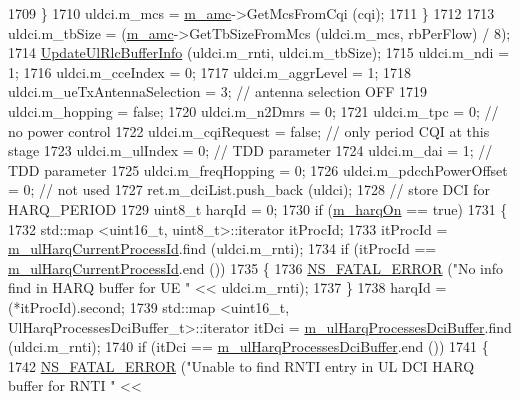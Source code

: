 \begin{DoxyCode}
1709             \}
1710           uldci.m\_mcs = \hyperlink{classns3_1_1TtaFfMacScheduler_a9c8e60d48cae88a03fb5621285733186}{m\_amc}->GetMcsFromCqi (cqi);
1711         \}
1712 
1713       uldci.m\_tbSize = (\hyperlink{classns3_1_1TtaFfMacScheduler_a9c8e60d48cae88a03fb5621285733186}{m\_amc}->GetTbSizeFromMcs (uldci.m\_mcs, rbPerFlow) / 8);
1714       \hyperlink{classns3_1_1TtaFfMacScheduler_ab833bf3832b55e3483befd9d0e9b2c13}{UpdateUlRlcBufferInfo} (uldci.m\_rnti, uldci.m\_tbSize);
1715       uldci.m\_ndi = 1;
1716       uldci.m\_cceIndex = 0;
1717       uldci.m\_aggrLevel = 1;
1718       uldci.m\_ueTxAntennaSelection = 3; \textcolor{comment}{// antenna selection OFF}
1719       uldci.m\_hopping = \textcolor{keyword}{false};
1720       uldci.m\_n2Dmrs = 0;
1721       uldci.m\_tpc = 0; \textcolor{comment}{// no power control}
1722       uldci.m\_cqiRequest = \textcolor{keyword}{false}; \textcolor{comment}{// only period CQI at this stage}
1723       uldci.m\_ulIndex = 0; \textcolor{comment}{// TDD parameter}
1724       uldci.m\_dai = 1; \textcolor{comment}{// TDD parameter}
1725       uldci.m\_freqHopping = 0;
1726       uldci.m\_pdcchPowerOffset = 0; \textcolor{comment}{// not used}
1727       ret.m\_dciList.push\_back (uldci);
1728       \textcolor{comment}{// store DCI for HARQ\_PERIOD}
1729       uint8\_t harqId = 0;
1730       \textcolor{keywordflow}{if} (\hyperlink{classns3_1_1TtaFfMacScheduler_a08875f91819cf2e7cf2ed3781d36cda1}{m\_harqOn} == \textcolor{keyword}{true})
1731         \{
1732           std::map <uint16\_t, uint8\_t>::iterator itProcId;
1733           itProcId = \hyperlink{classns3_1_1TtaFfMacScheduler_af8bd1675d63b73c0374a39180e1cbf54}{m\_ulHarqCurrentProcessId}.find (uldci.m\_rnti);
1734           \textcolor{keywordflow}{if} (itProcId == \hyperlink{classns3_1_1TtaFfMacScheduler_af8bd1675d63b73c0374a39180e1cbf54}{m\_ulHarqCurrentProcessId}.end ())
1735             \{
1736               \hyperlink{group__fatal_ga5131d5e3f75d7d4cbfd706ac456fdc85}{NS\_FATAL\_ERROR} (\textcolor{stringliteral}{"No info find in HARQ buffer for UE "} << uldci.m\_rnti);
1737             \}
1738           harqId = (*itProcId).second;
1739           std::map <uint16\_t, UlHarqProcessesDciBuffer\_t>::iterator itDci = 
      \hyperlink{classns3_1_1TtaFfMacScheduler_a9ead4d91174d42d6995978358c08689e}{m\_ulHarqProcessesDciBuffer}.find (uldci.m\_rnti);
1740           \textcolor{keywordflow}{if} (itDci == \hyperlink{classns3_1_1TtaFfMacScheduler_a9ead4d91174d42d6995978358c08689e}{m\_ulHarqProcessesDciBuffer}.end ())
1741             \{
1742               \hyperlink{group__fatal_ga5131d5e3f75d7d4cbfd706ac456fdc85}{NS\_FATAL\_ERROR} (\textcolor{stringliteral}{"Unable to find RNTI entry in UL DCI HARQ buffer for RNTI "} << 

\end{DoxyCode}
